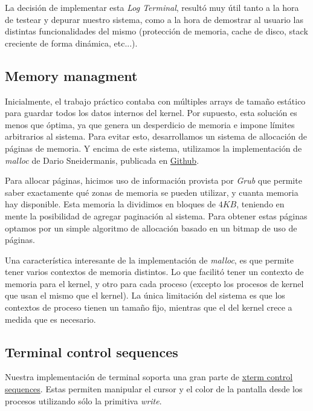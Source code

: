 \documentclass[a4paper,10pt]{article}
\begin{document}
        La decisión de implementar esta \textit{Log Terminal}, resultó muy útil tanto a la hora de testear y depurar nuestro sistema, como a la hora de demostrar al 
        usuario las distintas funcionalidades del mismo (protección de memoria, cache de disco, stack creciente de forma dinámica, etc...).\\


        \subsection{Memory managment}
        Inicialmente, el trabajo práctico contaba con múltiples arrays de tamaño estático para guardar todos los datos internos del kernel.
        Por supuesto, esta solución es menos que óptima, ya que genera un desperdicio de memoria e impone límites arbitrarios al sistema.
        Para evitar esto, desarrollamos un sistema de allocación de páginas de memoria.
        Y encima de este sistema, utilizamos la implementación de \textit{malloc} de Dario Sneidermanis, publicada en \href{https://github.com/esneider/malloc}{Github}.

        Para allocar páginas, hicimos uso de información provista por \textit{Grub} que permite saber exactamente qué zonas de memoria se pueden utilizar, 
        y cuanta memoria hay disponible.
        Esta memoria la dividimos en bloques de $4KB$, teniendo en mente la posibilidad de agregar paginación al sistema.
        Para obtener estas páginas optamos por un simple algoritmo de allocación basado en un bitmap de uso de páginas.

        Una característica interesante de la implementación de \textit{malloc}, es que permite tener varios contextos de memoria distintos.
        Lo que facilitó tener un contexto de memoria para el kernel, y otro para cada proceso (excepto los procesos de kernel que usan el mismo que el kernel).
        La única limitación del sistema es que los contextos de proceso tienen un tamaño fijo, mientras que el del kernel crece a medida que es necesario.\\


        \subsection{Terminal control sequences}
        Nuestra implementación de terminal soporta una gran parte de \href{http://invisible-island.net/xterm/ctlseqs/ctlseqs.html}{xterm control sequences}.
        Estas permiten manipular el cursor y el color de la pantalla desde los procesos utilizando sólo la primitiva \textit{write}.
\end{document}
